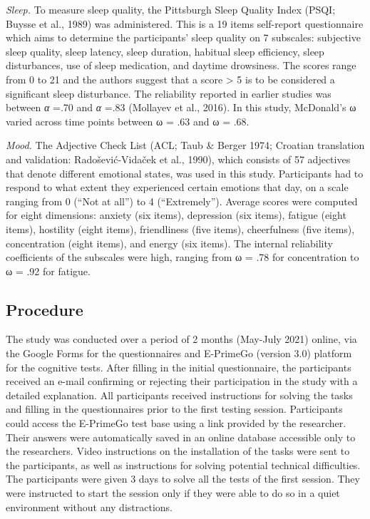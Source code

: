 \documentclass[authordate, empirical]{jote-new-article}
\begin{document}
\emph{Sleep. }To measure sleep quality, the\emph{ }Pittsburgh Sleep Quality Index (PSQI; Buysse et al., 1989) was administered. This is a 19 items self-report questionnaire which aims to determine the participants' sleep quality on 7 subscales: subjective sleep quality, sleep latency, sleep duration, habitual sleep efficiency, sleep disturbances, use of sleep medication, and daytime drowsiness. The scores range from 0 to 21 and the authors suggest that a score > 5 is to be considered a significant sleep disturbance. The reliability reported in earlier studies was between \emph{α }=.70 and \emph{α }=.83 (Mollayev et al., 2016). In this study, McDonald's ω varied across time points between ω = .63 and ω = .68.



\emph{Mood. }The Adjective Check List (ACL; Taub \& Berger 1974; Croatian translation and validation: Radošević-Vidaček et al., 1990), which consists of 57 adjectives that denote different emotional states, was used in this study. Participants had to respond to what extent they experienced certain emotions that day, on a scale ranging from 0 (“Not at all”) to 4 (“Extremely”). Average scores were computed for eight dimensions: anxiety (six items), depression (six items), fatigue (eight items), hostility (eight items), friendliness (five items), cheerfulness (five items), concentration (eight items), and energy (six items). The internal reliability coefficients of the subscales were high, ranging from ω = .78 for concentration to ω = .92 for fatigue.



\subsection{Procedure }



The study was conducted over a period of 2 months (May-July 2021) online, via the Google Forms for the questionnaires and E-PrimeGo (version 3.0) platform for the cognitive tests. After filling in the initial questionnaire, the participants received an e-mail confirming or rejecting their participation in the study with a detailed explanation. All participants received instructions for solving the tasks and filling in the questionnaires prior to the first testing session. Participants could access the E-PrimeGo test base using a link provided by the researcher. Their answers were automatically saved in an online database accessible only to the researchers. Video instructions on the installation of the tasks were sent to the participants, as well as instructions for solving potential technical difficulties. The participants were given 3 days to solve all the tests of the first session. They were instructed to start the session only if they were able to do so in a quiet environment without any distractions.
\end{document}
